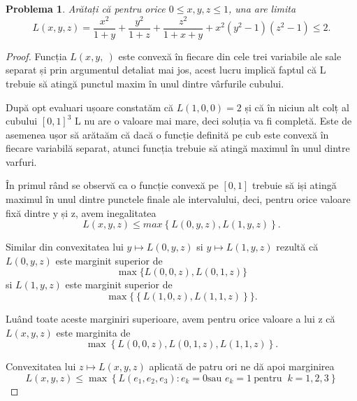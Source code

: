 \documentclass[a4paper,12pt,oneside]{report}
\newtheorem{problem}{Problema}
\begin{document}
\begin{problem}
	Arătați că pentru orice \(0\leq x , y , z \leq 1\), una are limita
\begin{displaymath}
  L\left ( x , y , z \right ) = \frac{x^{2}}{1 + y} + \frac{y^{2}}{1 + z} + \frac{z^{2}}{1 + x+ y} + x^{2} \left ( y^{2} - 1 \right )\left ( z^{2} - 1 \right ) \leq 2.
\end{displaymath}
\end{problem}
\begin{proof}
Funcția \(L\left ( x,y,\ \right )\) este convexă în fiecare din cele trei variabile ale sale separat și prin argumentul detaliat mai jos, acest lucru implică faptul că L trebuie să atingă punctul maxim  în unul dintre vârfurile cubului.

După opt evaluari ușoare constatăm că \(L \left ( 1,0,0 \right ) = 2\) și că în niciun alt colț al cubului $[0, 1]^3$ L nu are o valoare mai mare, deci soluția va fi completă. Este de asemenea ușor să arătaăm că dacă o funcție definită pe cub este convexă în fiecare variabilă separat, atunci funcția trebuie să atingă maximul în unul dintre varfuri.

În primul rând se observă ca o funcție convexă pe \(\left [ 0 , 1 \right ]\) trebuie să iși atingă maximul în unul dintre punctele finale ale intervalului, deci, pentru orice valoare fixă dintre y și z, avem inegalitatea
\begin{displaymath}
  L\left ( x,y,z \right )\leq max \left \{ L\left ( 0,y,z \right ), L\left ( 1,y,z \right ) \right \}.
\end{displaymath}

 Similar din convexitatea lui \(y \mapsto L\left ( 0,y,z \right )\) si \(y \mapsto L\left ( 1,y,z \right )\)  rezultă că \(L\left ( 0, y, z \right )\) este marginit superior de  \[\max \{L\left ( 0,0,z \right ), L\left ( 0,1,z \right )\}\] si \( L\left ( 1,y,z \right )\) este marginit superior de \[\max \{\left \{ L\left ( 1,0,z \right ) , L \left ( 1,1,z \right )\right \}\}.\]

 Luând toate aceste marginiri superioare, avem pentru orice valoare a lui z că \(L\left ( x,y,z \right )\) este marginita de
 \[\max\left \{ L\left ( 0,0,z \right ), L\left ( 0,1,z \right ), L\left ( 1,1,z \right ) \right \}.\]

 Convexitatea lui \(z \mapsto L\left ( x,y,z \right )\) aplicată de patru ori ne dă apoi marginirea
 \begin{displaymath}
  L\left ( x,y,z \right ) \leq  \max \left \{ L\left ( e_{1} , e_{2}, e_{3}\right ): e_{k}  = 0 \text{sau } e_{k} = 1 ~\text{pentru }~ k = 1,2,3\right \}
\end{displaymath}
\end{proof}
\end{document}
